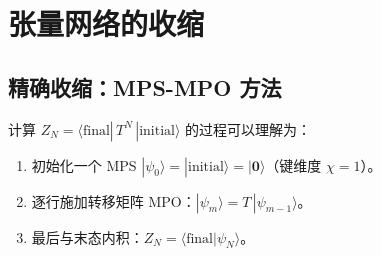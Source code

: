 \documentclass[12pt,a4paper]{ctexart}
\begin{document}
\section{张量网络的收缩}

\subsection{精确收缩：MPS-MPO 方法}

计算 $Z_N = \langle \text{final}| \, T^N \, |\text{initial}\rangle$ 的过程可以理解为：

\begin{enumerate}
    \item 初始化一个 MPS $|\psi_0\rangle = |\text{initial}\rangle = |\mathbf{0}\rangle$（键维度 $\chi = 1$）。
    \item 逐行施加转移矩阵 MPO：$|\psi_m\rangle = T \, |\psi_{m-1}\rangle$。
    \item 最后与末态内积：$Z_N = \langle \text{final}|\psi_N\rangle$。
\end{enumerate}
\end{document}
